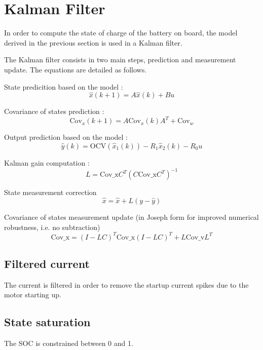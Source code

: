 \documentclass{article}
\begin{document}
\section{Kalman Filter}
In order to compute the state of charge of the battery on board, the model derived in the previous section is used in a Kalman filter. 

The Kalman filter consists in two main steps, prediction and measurement update. The equations are detailed as follows. 

State predicition based on the model : 
\begin{equation}
\hat{x}(k+1) = A\hat{x}(k) + Bu 
\label{eq:1a} 
\end{equation}

Covariance of states prediction :
\begin{equation}
\text{Cov}_x (k+1) = A\text{Cov}_x(k)A^T + \text{Cov}_w  
\label{eq:1b}
\end{equation}

Output prediction based on the model :
\begin{equation}
\hat{y}(k) = \text{OCV}(\hat{x}_1(k)) - R_1 \hat{x}_2(k) - R_0u
\label{eq:1c}
\end{equation}

Kalman gain computation :
\begin{equation}
L = \text{Cov_x} C^T (C \text{Cov_x} C^T)^{-1}
\label{eq:2a}
\end{equation}

State measurement correction
\begin{equation}
\hat{x} = \hat{x} + L(y-\hat{y})
\label{eq:2b}
\end{equation}

Covariance of states measurement update (in Joseph form for improved numerical robustness, i.e. no subtraction)
\begin{equation}
\text{Cov_x} = (I-LC)^T \text{Cov_x} (I-LC)^T + L \text{Cov_v} L^T
\label{eq:2c}
\end{equation}

\subsection{Filtered current}
The current is filtered in order to remove the startup current spikes due to the motor starting up.

\subsection{State saturation}
The SOC is constrained between 0 and 1.
\end{document}
